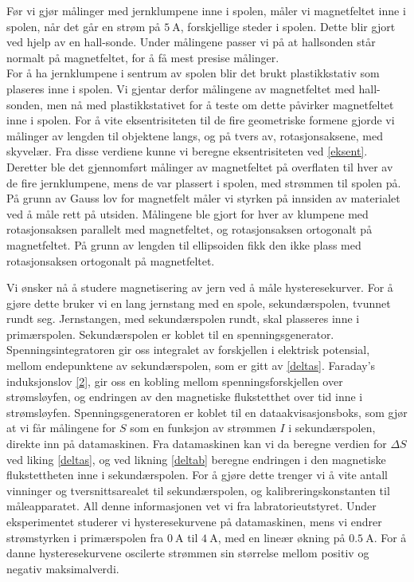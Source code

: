 \documentclass[%
 reprint,
 amsmath,amssymb,
 aps,
 norsk,
]{revtex4-1}
\begin{document}
Før vi gjør målinger med jernklumpene inne i spolen, måler vi magnetfeltet inne i spolen, når det går en strøm på $\SI{5}{\ampere}$, forskjellige steder i spolen. Dette blir gjort ved hjelp av en hall-sonde. Under målingene passer vi på at hallsonden står normalt på magnetfeltet, for å få mest presise målinger.\\For å ha jernklumpene i sentrum av spolen blir det brukt plastikkstativ som plaseres inne i spolen. Vi gjentar derfor målingene av magnetfeltet med hall-sonden, men nå med plastikkstativet for å teste om dette påvirker magnetfeltet inne i spolen. For å vite eksentrisiteten til de fire geometriske formene gjorde vi målinger av lengden til objektene langs, og på tvers av, rotasjonsaksene, med skyvelær. Fra disse verdiene kunne vi beregne eksentrisiteten ved \eqref{eksent}.\\
Deretter ble det gjennomført målinger av magnetfeltet på overflaten til hver av de fire jernklumpene, mens de var plassert i spolen, med strømmen til spolen på. På grunn av Gauss lov for magnetfelt måler vi styrken på innsiden av materialet ved å måle rett på utsiden. Målingene ble gjort for hver av klumpene med rotasjonsaksen parallelt med magnetfeltet, og rotasjonsaksen ortogonalt på magnetfeltet. På grunn av lengden til ellipsoiden fikk den ikke plass med rotasjonsaksen ortogonalt på magnetfeltet.\par
Vi ønsker nå å studere magnetisering av jern ved å måle hysteresekurver. For å gjøre dette bruker vi en lang jernstang med en spole, sekundærspolen, tvunnet rundt seg. Jernstangen, med sekundærspolen rundt, skal plasseres inne i primærspolen. Sekundærspolen er koblet til en spenningsgenerator. Spenningsintegratoren gir oss integralet av forskjellen i elektrisk potensial, mellom endepunktene av sekundærspolen, som er gitt av \eqref{deltas}. Faraday's induksjonslov \eqref{2}, gir oss en kobling mellom spenningsforskjellen over strømsløyfen, og endringen av den magnetiske flukstetthet over tid inne i strømsløyfen. Spenningsgeneratoren er koblet til en dataakvisasjonsboks, som gjør at vi får målingene for $S$ som en funksjon av strømmen $I$ i sekundærspolen, direkte inn på datamaskinen. Fra datamaskinen kan vi da beregne verdien for $\Delta S$ ved liking \eqref{deltas}, og ved likning \eqref{deltab} beregne endringen i den magnetiske flukstettheten inne i sekundærspolen. For å gjøre dette trenger vi å vite antall vinninger og tversnittsarealet til sekundærspolen, og kalibreringskonstanten til måleapparatet. All denne informasjonen vet vi fra labratorieutstyret. Under eksperimentet studerer vi hysteresekurvene på datamaskinen, mens vi endrer strømstyrken i primærspolen fra $\SI{0}{\ampere}$ til $\SI{4}{\ampere}$, med en lineær økning på $\SI{0.5}{\ampere}$. For å danne hysteresekurvene oscilerte strømmen sin størrelse mellom positiv og negativ maksimalverdi.
\end{document}
